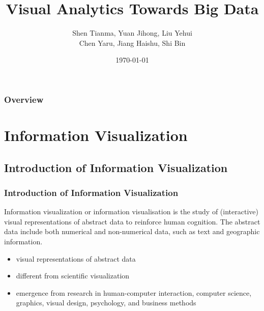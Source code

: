 \documentclass{beamer}
\title[Visual Analytics Towards Big Data]{Visual Analytics Towards Big Data} %
\author{Shen Tianma, Yuan Jihong, Liu Yehui \texorpdfstring{\\ Chen Yaru, Jiang Haishu, Shi Bin}{} } %
\institute[USST] %
{
University of Shanghai for Science and Technology \\ %
\medskip
\textit{} %
}
\date{\today} %
\begin{document}
\begin{frame}
\titlepage %
\end{frame}

\begin{frame}
\frametitle{Overview} %
\tableofcontents %
\end{frame}


\section{Information Visualization}

\subsection{Introduction of Information Visualization}
\begin{frame}
  \frametitle{Introduction of Information Visualization}
  \qquad Information visualization or information visualisation is the study of (interactive) visual representations of abstract data to reinforce human cognition. The abstract data include both numerical and non-numerical data, such as text and geographic information.\\

  \begin{itemize}
    \item visual representations of abstract data 
    \item different from scientific visualization
    \item emergence from research in human-computer interaction, computer science, graphics, visual design, psychology, and business methods
  \end{itemize}

\end{frame}
\end{document}

